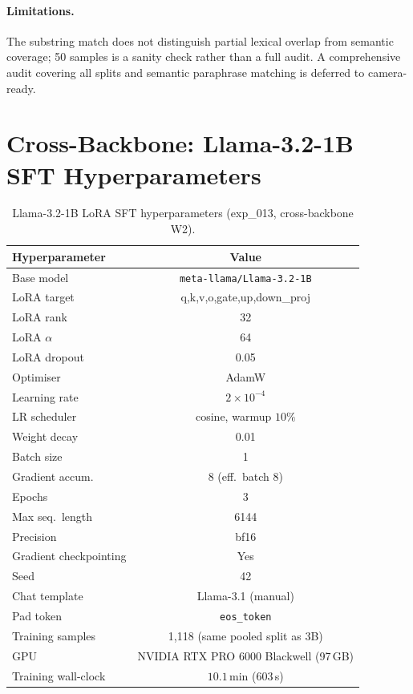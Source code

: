 \paragraph{Limitations.} The substring match does not distinguish partial lexical overlap from semantic coverage; 50 samples is a sanity check rather than a full audit. A comprehensive audit covering all splits and semantic paraphrase matching is deferred to camera-ready.

\section{Cross-Backbone: Llama-3.2-1B SFT Hyperparameters}
\label{app:llama1b_hparams}

\begin{table}[h]
\small
\centering
\caption{Llama-3.2-1B LoRA SFT hyperparameters (exp\_013, cross-backbone W2).}
\label{tab:llama1b_hparams}
\begin{tabular}{lc}
\toprule
Hyperparameter & Value \\
\midrule
Base model & \texttt{meta-llama/Llama-3.2-1B} \\
LoRA target & q,k,v,o,gate,up,down\_proj \\
LoRA rank & 32 \\
LoRA $\alpha$ & 64 \\
LoRA dropout & 0.05 \\
Optimiser & AdamW \\
Learning rate & $2\times10^{-4}$ \\
LR scheduler & cosine, warmup $10\%$ \\
Weight decay & 0.01 \\
Batch size & 1 \\
Gradient accum. & 8 (eff.\ batch 8) \\
Epochs & 3 \\
Max seq.\ length & 6144 \\
Precision & bf16 \\
Gradient checkpointing & Yes \\
Seed & 42 \\
Chat template & Llama-3.1 (manual) \\
Pad token & \texttt{eos\_token} \\
\midrule
Training samples & 1{,}118 (same pooled split as 3B) \\
GPU & NVIDIA RTX PRO 6000 Blackwell (97\,GB) \\
Training wall-clock & $10.1$\,min (603\,s) \\
\bottomrule
\end{tabular}
\end{table}

